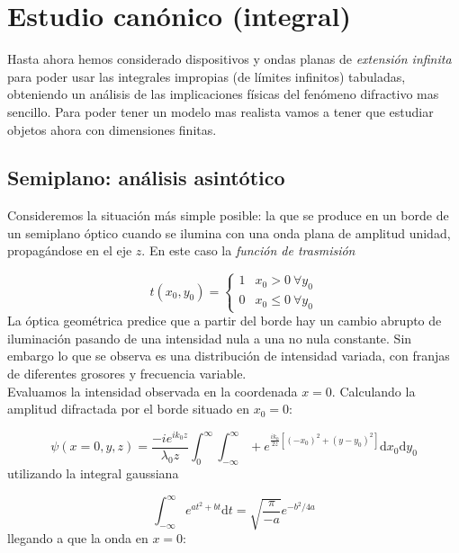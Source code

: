 \documentclass[12pt,a4paper]{book}
\numberwithin{equation}{section}
\numberwithin{figure}{section}
\newcommand{\ccorchetes}[1]{\left[ #1  \right]}
\newcommand{\D}{\mathrm{d}}
\newcommand{\1}{_{(1)}}
\newcommand{\2}{_{(2)}}
\newcommand{\intinf}{\int_{-\infty}^{\infty}}
\theoremstyle{definition}
\begin{document}
\section{Estudio canónico (integral)}


Hasta ahora hemos considerado dispositivos y ondas planas de \textit{extensión infinita} para poder usar las integrales impropias (de límites infinitos) tabuladas, obteniendo un análisis de las implicaciones físicas del fenómeno difractivo mas sencillo. Para poder tener un modelo mas realista vamos a tener que estudiar objetos ahora con dimensiones finitas. \\

\subsection{Semiplano: análisis asintótico}

Consideremos la situación más simple posible: la que se produce en un borde de un semiplano óptico cuando se ilumina con una onda plana de amplitud unidad, propagándose en el eje $z$. En este caso la \textit{función de trasmisión}


\begin{equation}
    t(x_0,y_0) = \left\lbrace \begin{array}{ll}
       1  & x_0>0 \ \forall y_0  \\
       0  & x_0\leq 0 \ \forall y_0
    \end{array} \right.
\end{equation}
La óptica geométrica predice que a partir del borde hay un cambio abrupto de iluminación pasando de una intensidad nula a una no nula constante. Sin embargo lo que se observa es una distribución de intensidad variada, con franjas de diferentes grosores y frecuencia variable. \\

Evaluamos la intensidad observada en la coordenada $x=0$. Calculando la amplitud difractada por el borde situado en $x_0=0$:

\begin{equation}
    \psi (x=0,y,z) = \frac{-i e^{ik_0z}}{\lambda_0 z} \int_0^\infty \intinf  +
    e^{\frac{ik_0}{2z} \ccorchetes{(-x_0)^2+(y-y_0)^2}}  \D x_0 \D y_0
\end{equation}
utilizando la integral gaussiana

\begin{equation}
    \intinf e^{at^2+bt} \D t  = \sqrt{\frac{\pi}{-a}} e^{-b^2/4a}
\end{equation}
llegando a que la onda en $x=0$:
\end{document}
